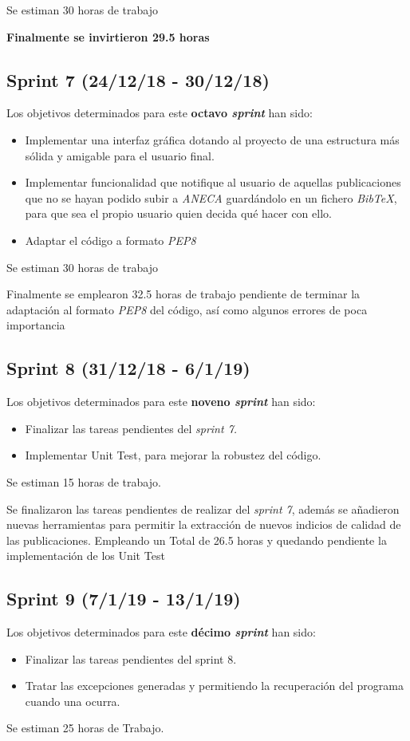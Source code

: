 Se estiman 30 horas de trabajo

\textbf{Finalmente se invirtieron 29.5 horas}
\subsection{Sprint 7 (24/12/18 - 30/12/18)}
Los objetivos determinados para este \textbf{octavo \emph{sprint}} han sido:
\begin{itemize}
	\item Implementar una interfaz gráfica dotando al proyecto de una estructura más sólida y amigable para el usuario final.
	\item Implementar funcionalidad que notifique al usuario de aquellas publicaciones que no se hayan podido subir a \emph{ANECA} guardándolo en un fichero \emph{BibTeX}, para que sea el propio usuario quien decida qué hacer con ello.
	\item Adaptar el código a formato \emph{PEP8}
\end{itemize}

Se estiman 30 horas de trabajo

Finalmente se emplearon 32.5 horas de trabajo pendiente de terminar la adaptación al formato \emph{PEP8} del código, así como algunos errores de poca importancia
\subsection{Sprint 8 (31/12/18 - 6/1/19)}

Los objetivos determinados para este \textbf{noveno \emph{sprint}} han sido:
\begin{itemize}
	\item Finalizar las tareas pendientes del \emph{sprint 7.}
	\item Implementar Unit Test, para mejorar la robustez del código.
\end{itemize}
Se estiman 15 horas de trabajo.

Se finalizaron las tareas pendientes de realizar del \emph{sprint 7}, además se añadieron nuevas herramientas para permitir la extracción de nuevos indicios de calidad de las publicaciones.
Empleando un Total de 26.5 horas y quedando pendiente la implementación de los Unit Test
\subsection{Sprint 9 (7/1/19 - 13/1/19)}
Los objetivos determinados para este \textbf{décimo \emph{sprint}} han sido:
\begin{itemize}
	\item Finalizar las tareas pendientes del sprint 8.
	\item Tratar las excepciones generadas y permitiendo la recuperación del programa cuando una ocurra.
\end{itemize}
Se estiman 25 horas de Trabajo.

